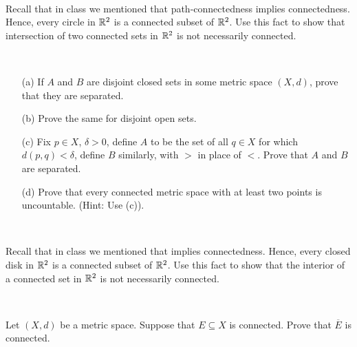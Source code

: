 \documentclass[a4paper]{article}
\begin{document}
\

\newpage
\begin{problem}
    Recall that in class we mentioned that path-connectedness implies connectedness. Hence, every circle in \( \mathbb{R}^{2} \) is a connected subset of \( \mathbb{R}^{2} \). Use this fact to show that intersection of two connected sets in \( \mathbb{R}^{2} \) is not necessarily connected.
\end{problem}
\newpage 

\

\newpage
\begin{problem}
    \begin{enumerate}
        \item[(a)] If \( A  \) and \( B  \) are disjoint closed sets in some metric space \( (X,d) \), prove that they are separated. 
        \item[(b)] Prove the same for disjoint open sets.
        \item[(c)] Fix \( p \in X  \), \( \delta > 0  \), define \( A  \) to be the set of all \( q \in X  \) for which \( d(p,q) < \delta \), define \( B  \) similarly, with \( >  \) in place of \( <  \). Prove that \( A  \) and \( B  \) are separated.
        \item[(d)] Prove that every connected metric space with at least two points is uncountable. (Hint: Use (c)).
    \end{enumerate}
\end{problem}




\newpage 

\

\newpage




\begin{problem}
    Recall that in class we mentioned that implies connectedness. Hence, every closed disk in \( \mathbb{R}^{2} \) is a connected subset of \( \mathbb{R}^{2} \). Use this fact to show that the interior of a connected set in \( \mathbb{R}^{2} \) is not necessarily connected.
\end{problem}

\newpage 

\

\newpage


\begin{problem}
    Let \( (X,d) \) be a metric space. Suppose that \( E \subseteq X  \) is connected. Prove that \( \overline{E} \) is connected.
\end{problem}
\newpage 

\
\end{document}

